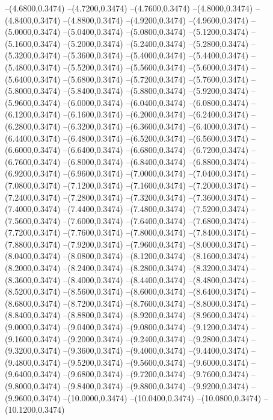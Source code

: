 {	--(4.6800,0.3474)
	--(4.7200,0.3474)
	--(4.7600,0.3474)
	--(4.8000,0.3474)
	--(4.8400,0.3474)
	--(4.8800,0.3474)
	--(4.9200,0.3474)
	--(4.9600,0.3474)
	--(5.0000,0.3474)
	--(5.0400,0.3474)
	--(5.0800,0.3474)
	--(5.1200,0.3474)
	--(5.1600,0.3474)
	--(5.2000,0.3474)
	--(5.2400,0.3474)
	--(5.2800,0.3474)
	--(5.3200,0.3474)
	--(5.3600,0.3474)
	--(5.4000,0.3474)
	--(5.4400,0.3474)
	--(5.4800,0.3474)
	--(5.5200,0.3474)
	--(5.5600,0.3474)
	--(5.6000,0.3474)
	--(5.6400,0.3474)
	--(5.6800,0.3474)
	--(5.7200,0.3474)
	--(5.7600,0.3474)
	--(5.8000,0.3474)
	--(5.8400,0.3474)
	--(5.8800,0.3474)
	--(5.9200,0.3474)
	--(5.9600,0.3474)
	--(6.0000,0.3474)
	--(6.0400,0.3474)
	--(6.0800,0.3474)
	--(6.1200,0.3474)
	--(6.1600,0.3474)
	--(6.2000,0.3474)
	--(6.2400,0.3474)
	--(6.2800,0.3474)
	--(6.3200,0.3474)
	--(6.3600,0.3474)
	--(6.4000,0.3474)
	--(6.4400,0.3474)
	--(6.4800,0.3474)
	--(6.5200,0.3474)
	--(6.5600,0.3474)
	--(6.6000,0.3474)
	--(6.6400,0.3474)
	--(6.6800,0.3474)
	--(6.7200,0.3474)
	--(6.7600,0.3474)
	--(6.8000,0.3474)
	--(6.8400,0.3474)
	--(6.8800,0.3474)
	--(6.9200,0.3474)
	--(6.9600,0.3474)
	--(7.0000,0.3474)
	--(7.0400,0.3474)
	--(7.0800,0.3474)
	--(7.1200,0.3474)
	--(7.1600,0.3474)
	--(7.2000,0.3474)
	--(7.2400,0.3474)
	--(7.2800,0.3474)
	--(7.3200,0.3474)
	--(7.3600,0.3474)
	--(7.4000,0.3474)
	--(7.4400,0.3474)
	--(7.4800,0.3474)
	--(7.5200,0.3474)
	--(7.5600,0.3474)
	--(7.6000,0.3474)
	--(7.6400,0.3474)
	--(7.6800,0.3474)
	--(7.7200,0.3474)
	--(7.7600,0.3474)
	--(7.8000,0.3474)
	--(7.8400,0.3474)
	--(7.8800,0.3474)
	--(7.9200,0.3474)
	--(7.9600,0.3474)
	--(8.0000,0.3474)
	--(8.0400,0.3474)
	--(8.0800,0.3474)
	--(8.1200,0.3474)
	--(8.1600,0.3474)
	--(8.2000,0.3474)
	--(8.2400,0.3474)
	--(8.2800,0.3474)
	--(8.3200,0.3474)
	--(8.3600,0.3474)
	--(8.4000,0.3474)
	--(8.4400,0.3474)
	--(8.4800,0.3474)
	--(8.5200,0.3474)
	--(8.5600,0.3474)
	--(8.6000,0.3474)
	--(8.6400,0.3474)
	--(8.6800,0.3474)
	--(8.7200,0.3474)
	--(8.7600,0.3474)
	--(8.8000,0.3474)
	--(8.8400,0.3474)
	--(8.8800,0.3474)
	--(8.9200,0.3474)
	--(8.9600,0.3474)
	--(9.0000,0.3474)
	--(9.0400,0.3474)
	--(9.0800,0.3474)
	--(9.1200,0.3474)
	--(9.1600,0.3474)
	--(9.2000,0.3474)
	--(9.2400,0.3474)
	--(9.2800,0.3474)
	--(9.3200,0.3474)
	--(9.3600,0.3474)
	--(9.4000,0.3474)
	--(9.4400,0.3474)
	--(9.4800,0.3474)
	--(9.5200,0.3474)
	--(9.5600,0.3474)
	--(9.6000,0.3474)
	--(9.6400,0.3474)
	--(9.6800,0.3474)
	--(9.7200,0.3474)
	--(9.7600,0.3474)
	--(9.8000,0.3474)
	--(9.8400,0.3474)
	--(9.8800,0.3474)
	--(9.9200,0.3474)
	--(9.9600,0.3474)
	--(10.0000,0.3474)
	--(10.0400,0.3474)
	--(10.0800,0.3474)
	--(10.1200,0.3474)
}

